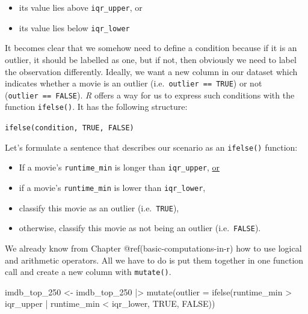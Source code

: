 \documentclass[
  letterpaper,
]{krantz}
\makeatletter
\newenvironment{Shaded}{\begin{snugshade}}{\end{snugshade}}
\newcommand{\AttributeTok}[1]{\textcolor[rgb]{0.40,0.45,0.13}{#1}}
\newcommand{\ConstantTok}[1]{\textcolor[rgb]{0.56,0.35,0.01}{#1}}
\newcommand{\FunctionTok}[1]{\textcolor[rgb]{0.28,0.35,0.67}{#1}}
\newcommand{\NormalTok}[1]{\textcolor[rgb]{0.00,0.23,0.31}{#1}}
\newcommand{\OtherTok}[1]{\textcolor[rgb]{0.00,0.23,0.31}{#1}}
\newcommand{\SpecialCharTok}[1]{\textcolor[rgb]{0.37,0.37,0.37}{#1}}
\newenvironment{kframe}{%
\medskip{}
\setlength{\fboxsep}{.8em}
 \def\at@end@of@kframe{}%
 \ifinner\ifhmode%
  \def\at@end@of@kframe{\end{minipage}}%
  \begin{minipage}{\columnwidth}%
 \fi\fi%
 \def\FrameCommand##1{\hskip\@totalleftmargin \hskip-\fboxsep
 \colorbox{shadecolor}{##1}\hskip-\fboxsep
     \hskip-\linewidth \hskip-\@totalleftmargin \hskip\columnwidth}%
 \MakeFramed {\advance\hsize-\width
   \@totalleftmargin\z@ \linewidth\hsize
   \@setminipage}}%
 {\par\unskip\endMakeFramed%
 \at@end@of@kframe}
\renewenvironment{Shaded}{\begin{kframe}}{\end{kframe}}
\makeatother
\begin{document}
\begin{itemize}
\item
  its value lies above \texttt{iqr\_upper}, or
\item
  its value lies below \texttt{iqr\_lower}
\end{itemize}

It becomes clear that we somehow need to define a condition because if
it is an outlier, it should be labelled as one, but if not, then
obviously we need to label the observation differently. Ideally, we want
a new column in our dataset which indicates whether a movie is an
outlier (i.e.~\texttt{outlier\ ==\ TRUE}) or not
(\texttt{outlier\ ==\ FALSE}). \emph{R} offers a way for us to express
such conditions with the function \texttt{ifelse()}. It has the
following structure:

\label{ifelse-function}
\texttt{ifelse(condition,\ TRUE,\ FALSE)}

Let's formulate a sentence that describes our scenario as an
\texttt{ifelse()} function:

\begin{itemize}
\item
  If a movie's \texttt{runtime\_min} is longer than \texttt{iqr\_upper},
  \ul{or}
\item
  if a movie's \texttt{runtime\_min} is lower than \texttt{iqr\_lower},
\item
  classify this movie as an outlier (i.e.~\texttt{TRUE}),
\item
  otherwise, classify this movie as not being an outlier
  (i.e.~\texttt{FALSE}).
\end{itemize}

We already know from Chapter @ref(basic-computations-in-r) how to use
logical and arithmetic operators. All we have to do is put them together
in one function call and create a new column with \texttt{mutate()}.

\begin{Shaded}
\begin{Highlighting}[]
\NormalTok{imdb\_top\_250 }\OtherTok{\textless{}{-}}
\NormalTok{  imdb\_top\_250 }\SpecialCharTok{|\textgreater{}}
  \FunctionTok{mutate}\NormalTok{(}\AttributeTok{outlier =} \FunctionTok{ifelse}\NormalTok{(runtime\_min }\SpecialCharTok{\textgreater{}}\NormalTok{ iqr\_upper }\SpecialCharTok{|}
\NormalTok{                            runtime\_min }\SpecialCharTok{\textless{}}\NormalTok{ iqr\_lower,}
                          \ConstantTok{TRUE}\NormalTok{, }\ConstantTok{FALSE}\NormalTok{))}
\end{Highlighting}
\end{Shaded}
\end{document}
